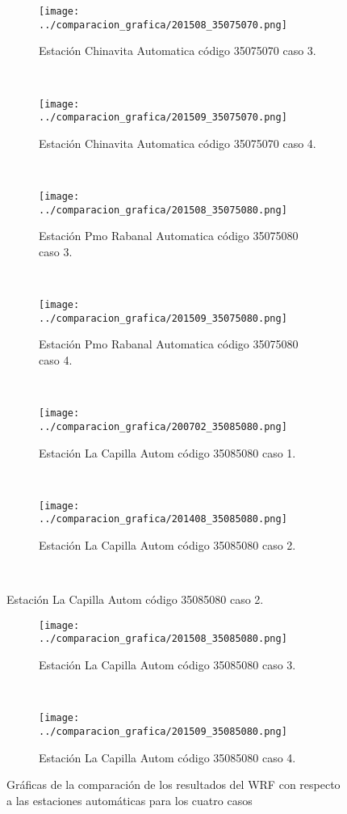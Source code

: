 \begin{figure}[H]
\centering
\begin{subfigure}[normla]{0.4\textwidth}
\caption{Estación Chinavita Automatica código 35075070 caso 3.}
\texttt{[image: ../comparacion\_grafica/201508\_35075070.png]}
\end{subfigure}
~
\begin{subfigure}[normla]{0.4\textwidth}
\caption{Estación Chinavita Automatica código 35075070 caso 4.}
\texttt{[image: ../comparacion\_grafica/201509\_35075070.png]}
\end{subfigure}
~
\begin{subfigure}[normla]{0.4\textwidth}
\caption{Estación Pmo Rabanal Automatica  código 35075080 caso 3.}
\texttt{[image: ../comparacion\_grafica/201508\_35075080.png]}
\end{subfigure}
~
\begin{subfigure}[normla]{0.4\textwidth}
\caption{Estación Pmo Rabanal Automatica  código 35075080 caso 4.}
\texttt{[image: ../comparacion\_grafica/201509\_35075080.png]}
\end{subfigure}
~
\begin{subfigure}[normla]{0.4\textwidth}
\caption{Estación La Capilla Autom código 35085080 caso 1.}
\texttt{[image: ../comparacion\_grafica/200702\_35085080.png]}
\end{subfigure}
~
\begin{subfigure}[normla]{0.4\textwidth}
\caption{Estación La Capilla Autom código 35085080 caso 2.}
\texttt{[image: ../comparacion\_grafica/201408\_35085080.png]}
\end{subfigure}
~
\end{figure}
           
\begin{figure}[H]\ContinuedFloat
\centering
\begin{subfigure}[normla]{0.4\textwidth}
\caption{Estación La Capilla Autom código 35085080 caso 3.}
\texttt{[image: ../comparacion\_grafica/201508\_35085080.png]}
\end{subfigure}
~
\begin{subfigure}[normla]{0.4\textwidth}
\caption{Estación La Capilla Autom código 35085080 caso 4.}
\texttt{[image: ../comparacion\_grafica/201509\_35085080.png]}
\end{subfigure}

    
    \caption{Gráficas de la comparación de los resultados del WRF con respecto a las estaciones automáticas para los cuatro casos}
    \label{fig:my_label}
\end{figure}

